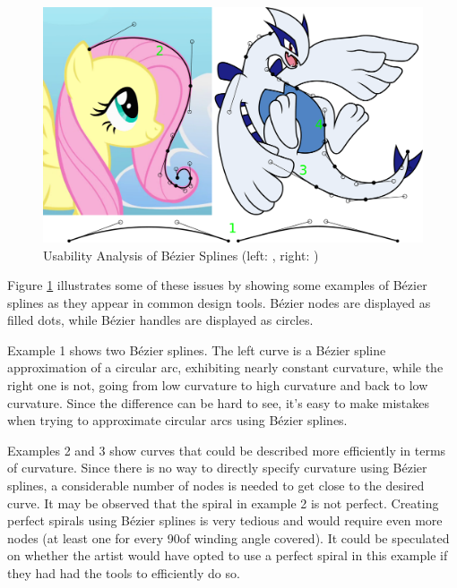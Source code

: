 \documentclass[a4paper]{article}
\begin{document}
				\begin{figure}[htb]
					\centering
					\includegraphics[width=\textwidth]{../resources/usability_bezier.pdf}
					\caption{Usability Analysis of Bézier Splines (left: \cite{Fluttershy}, right: \cite{Lugia})}
					\label{figure:usability_bézier}
				\end{figure}

				Figure \ref{figure:usability_bézier} illustrates some of these issues by showing some examples of Bézier splines as they appear in common design tools. Bézier nodes are displayed as filled dots, while Bézier handles are displayed as circles.

				Example 1 shows two Bézier splines. The left curve is a Bézier spline approximation of a circular arc, exhibiting nearly constant curvature, while the right one is not, going from low curvature to high curvature and back to low curvature. Since the difference can be hard to see, it's easy to make mistakes when trying to approximate circular arcs using Bézier splines.

				Examples 2 and 3 show curves that could be described more efficiently in terms of curvature. Since there is no way to directly specify curvature using Bézier splines, a considerable number of nodes is needed to get close to the desired curve. It may be observed that the spiral in example 2 is not perfect. Creating perfect spirals using Bézier splines is very tedious and would require even more nodes (at least one for every 90\textdegree of winding angle covered). It could be speculated on whether the artist would have opted to use a perfect spiral in this example if they had had the tools to efficiently do so.
\end{document}
